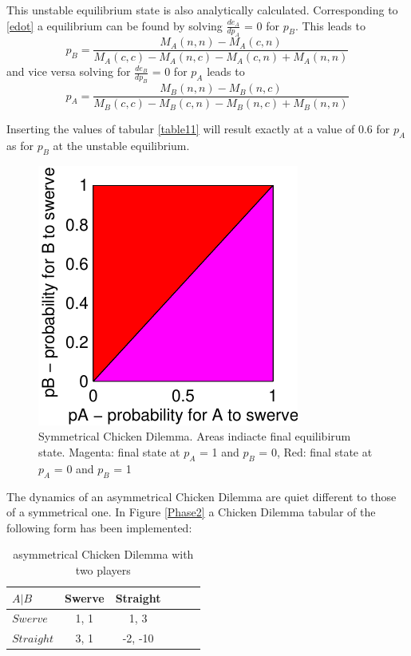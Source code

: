 \documentclass[11pt]{article}
\begin{document}
This unstable equilibrium state is also analytically calculated. Corresponding to \ref{edot} a equilibrium can be found by solving $\frac{d e_A}{d p_A}$ = 0 for $p_B$. This leads to
\begin{equation}
p_B = \frac{M_A(n,n) - M_A(c,n)}{M_A(c,c) - M_A(n,c) - M_A(c,n) + M_A(n,n)}
\end{equation} 
and vice versa solving for $\frac{d e_B}{d p_B}$ = 0 for $p_A$ leads to
\begin{equation}
p_A = \frac{M_B(n,n) - M_B(n,c)}{M_B(c,c) - M_B(c,n) - M_B(n,c) + M_B(n,n)}
\end{equation}

Inserting the values of tabular \ref{table11} will result exactly at a value of 0.6 for $p_A$ as for $p_B$ at the unstable equilibrium.



\begin{figure}[h]
\centering
\includegraphics[scale=1.5]{PhaseDiagramm2D.pdf}
\caption{Symmetrical Chicken Dilemma. Areas indiacte final equilibirum state. Magenta: final state at $p_A$ = 1 and $p_B$ = 0, Red: final state at $p_A$ = 0 and $p_B$ = 1 }
\label{Phase1}
\end{figure}

The dynamics of an asymmetrical Chicken Dilemma are quiet different to those of a symmetrical one. In Figure \ref{Phase2} a Chicken Dilemma tabular of the following form has been implemented:

\begin{table}[htbp]
\centering
\begin{tabular}{|l|c|c|l|c|c|}

\hline
$ A | B $     &     Swerve  &    Straight    \\                           
\hline
$ Swerve $      &  1,  1     &  1,  3  \\
\hline
$ Straight $      &  3,  1    &  -2,  -10      \\
\hline
\end{tabular}

\label{table1} 
\caption{asymmetrical Chicken Dilemma with two players}

\end{table}
\end{document}
